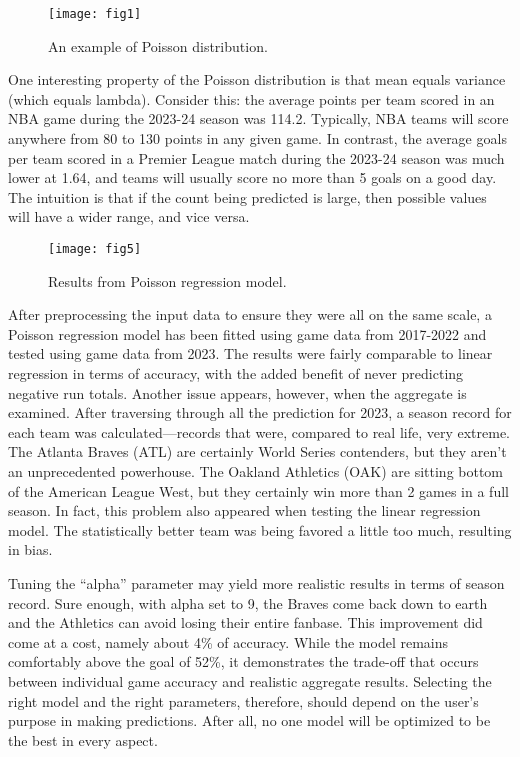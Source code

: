 \documentclass{paper}
\begin{document}
\begin{figure}[H]
  \centering
  \texttt{[image: fig1]}
  \caption{An example of Poisson distribution.}
\end{figure}

One interesting property of the Poisson distribution is that mean equals variance (which equals lambda). Consider this: the average points per team scored in an NBA game during the 2023-24 season was 114.2. Typically, NBA teams will score anywhere from 80 to 130 points in any given game. In contrast, the average goals per team scored in a Premier League match during the 2023-24 season was much lower at 1.64, and teams will usually score no more than 5 goals on a good day. The intuition is that if the count being predicted is large, then possible values will have a wider range, and vice versa.

\begin{figure}[H]
  \centering
  \texttt{[image: fig5]}
  \caption{Results from Poisson regression model.}
\end{figure}

After preprocessing the input data to ensure they were all on the same scale, a Poisson regression model has been fitted using game data from 2017-2022 and tested using game data from 2023. The results were fairly comparable to linear regression in terms of accuracy, with the added benefit of never predicting negative run totals. Another issue appears, however, when the aggregate is examined. After traversing through all the prediction for 2023, a season record for each team was calculated---records that were, compared to real life, very extreme. The Atlanta Braves (ATL) are certainly World Series contenders, but they aren't an unprecedented powerhouse. The Oakland Athletics (OAK) are sitting bottom of the American League West, but they certainly win more than 2 games in a full season. In fact, this problem also appeared when testing the linear regression model. The statistically better team was being favored a little too much, resulting in bias.

Tuning the ``alpha'' parameter may yield more realistic results in terms of season record. Sure enough, with alpha set to 9, the Braves come back down to earth and the Athletics can avoid losing their entire fanbase. This improvement did come at a cost, namely about 4\% of accuracy. While the model remains comfortably above the goal of 52\%, it demonstrates the trade-off that occurs between individual game accuracy and realistic aggregate results. Selecting the right model and the right parameters, therefore, should depend on the user's purpose in making predictions. After all, no one model will be optimized to be the best in every aspect.
\end{document}

